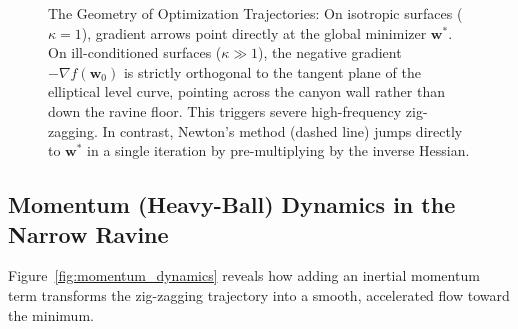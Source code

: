 \begin{figure}[htbp]
\caption{The Geometry of Optimization Trajectories: On isotropic surfaces ($\kappa = 1$), gradient arrows point directly at the global minimizer $\mathbf{w}^*$. On ill-conditioned surfaces ($\kappa \gg 1$), the negative gradient $-\nabla f(\mathbf{w}_0)$ is strictly orthogonal to the tangent plane of the elliptical level curve, pointing across the canyon wall rather than down the ravine floor. This triggers severe high-frequency zig-zagging. In contrast, Newton's method (dashed line) jumps directly to $\mathbf{w}^*$ in a single iteration by pre-multiplying by the inverse Hessian.}
\label{fig:gd_trajectories}
\end{figure}

\subsection{Momentum (Heavy-Ball) Dynamics in the Narrow Ravine}
Figure~\ref{fig:momentum_dynamics} reveals how adding an inertial momentum term transforms the zig-zagging trajectory into a smooth, accelerated flow toward the minimum.

